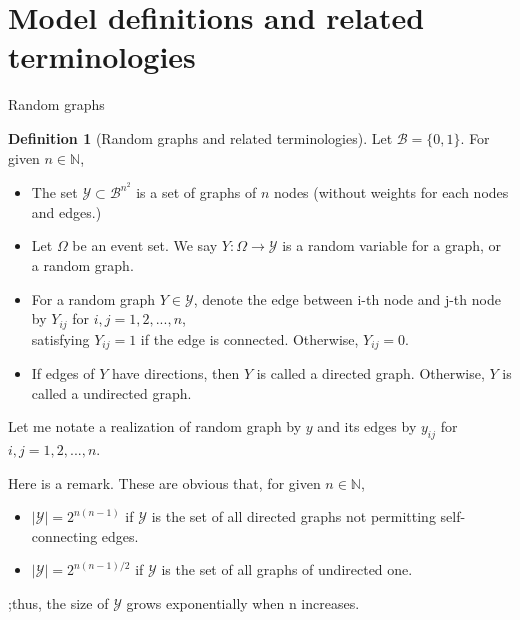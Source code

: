 \documentclass[aspectratio=169,ignorenonframetext,9pt]{beamer}
\theoremstyle{plain}
\theoremstyle{definition}
\newtheorem{defn}{Definition}[section]
\begin{document}
\section{Model definitions and related terminologies}
\begin{frame}{Random graphs}
    \begin{defn}[Random graphs and related terminologies]
    Let $\mathcal{B}=\{0,1\}$. For given $n\in \mathbb{N}$,
    \begin{itemize}
        \item The set $\mathcal{Y} \subset \mathcal{B}^{n^2}$ is a set of graphs of $n$ nodes (without weights for each nodes and edges.)
        \item Let $\Omega$ be an event set. We say $Y: \Omega \to \mathcal{Y}$ is a random variable for a graph, or a random graph.
        \item For a random graph $Y \in \mathcal{Y}$, denote the edge between i-th node and j-th node by $Y_{ij}$ for $i,j=1,2,...,n$, \\
            satisfying $Y_{ij}=1$ if the edge is connected. Otherwise, $Y_{ij}=0$.
        \item If edges of $Y$ have directions, then $Y$ is called a directed graph. Otherwise, $Y$ is called a undirected graph.
    \end{itemize}
    \end{defn}
    Let me notate a realization of random graph by $y$ and its edges by $y_{ij}$ for $i,j=1,2,...,n$.

    Here is a remark. These are obvious that, for given $n\in \mathbb{N}$,
    \begin{itemize}
        \item $|\mathcal{Y}|=2^{n(n-1)}$ if $\mathcal{Y}$ is the set of all directed graphs not permitting self-connecting edges.
        \item $|\mathcal{Y}|=2^{n(n-1)/2}$ if $\mathcal{Y}$ is the set of all graphs of undirected one.
    \end{itemize}
    ;thus, the size of $\mathcal{Y}$ grows exponentially when n increases.
\end{frame}
\end{document}
